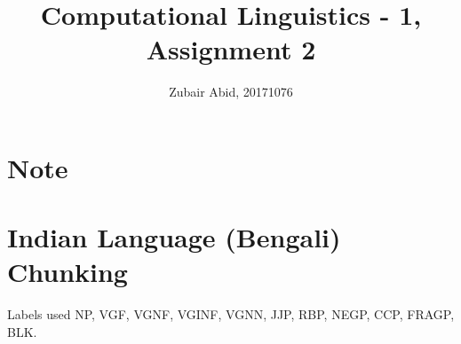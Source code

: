\documentclass[11pt,a4paper]{article}
\title{Computational Linguistics - 1, Assignment 2}
\author{Zubair Abid, 20171076}
\date{}
\begin{document}
	\maketitle	
		
	\section{Note}	
	
	{\bg 
	
	}

	\section{Indian Language (Bengali) Chunking}
	
	Labels used NP, VGF, VGNF, VGINF, VGNN, JJP, RBP, NEGP, CCP, FRAGP, BLK.\\
\end{document}
